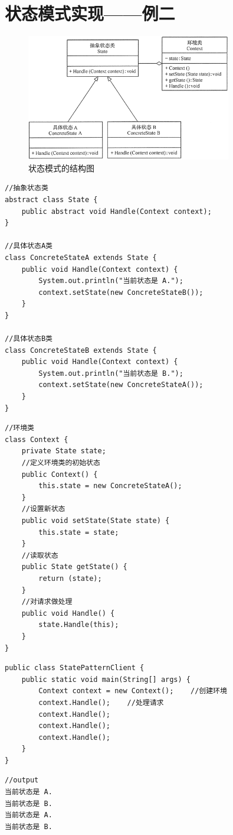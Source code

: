 \section{状态模式实现——例二}
\begin{figure}[!h]
	\centering
	\includegraphics[width=0.8\textwidth]{image/19-2}
	\caption{状态模式的结构图}
\end{figure}
\begin{lstlisting}
//抽象状态类
abstract class State {
	public abstract void Handle(Context context);
}

//具体状态A类
class ConcreteStateA extends State {
	public void Handle(Context context) {
		System.out.println("当前状态是 A.");
		context.setState(new ConcreteStateB());
	}
}

//具体状态B类
class ConcreteStateB extends State {
	public void Handle(Context context) {
		System.out.println("当前状态是 B.");
		context.setState(new ConcreteStateA());
	}
}
\end{lstlisting}
\begin{lstlisting}
//环境类
class Context {
	private State state;
	//定义环境类的初始状态
	public Context() {
		this.state = new ConcreteStateA();
	}
	//设置新状态
	public void setState(State state) {
		this.state = state;
	}
	//读取状态
	public State getState() {
		return (state);
	}
	//对请求做处理
	public void Handle() {
		state.Handle(this);
	}
}
\end{lstlisting}
\begin{lstlisting}
public class StatePatternClient {
	public static void main(String[] args) {
		Context context = new Context();    //创建环境
		context.Handle();    //处理请求
		context.Handle();
		context.Handle();
		context.Handle();
	}
}
\end{lstlisting}
\begin{lstlisting}
//output
当前状态是 A.
当前状态是 B.
当前状态是 A.
当前状态是 B.
\end{lstlisting}
